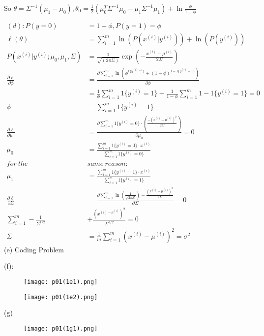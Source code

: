 \documentclass{article}
\begin{document}
So $\theta=\Sigma^{-1}(\mu_1-\mu_0),\theta_0=\frac{1}{2}(\mu_0^T\Sigma^{-1}\mu_0-\mu_1\Sigma^{-1}\mu_1)+\ln \frac{\phi}{1-\phi}$

\begin{align*}
(d): P(y=0)&=1-\phi,P(y=1)=\phi\\
\ell(\theta)&=\sum_{i=1}^m \ln(P(x^{(i)}|y^{(i)}))+\ln(P(y^{(i)}))
\\
P(x^{(i)}|y^{(i)};\mu_0,\mu_1,\Sigma)&=\frac{1}{\sqrt{(2\pi\Sigma)}}\exp(-\frac{x^{(i)}-\mu^{(i)}}{2\Sigma})
\\
\frac{\partial\ell}{\partial\phi}&=\frac{\partial \sum_{i=1}^m \ln(\phi^{1\{y^{(i)=1}\}}+(1-\phi)^{1-1\{y^{(i)}=1\}
})}{\partial \phi}\\&=\frac{1}{\phi}\sum_{i=1}^m 1\{y^{(i)}=1\}-\frac{1}{1-\phi}\sum_{i=1}^m1-1\{y^{(i)}=1\}=0\\
\phi &=\sum_{i=1}^m 1\{y^{(i)}=1\}\\
\frac{\partial\ell}{\partial\mu_0}&=\frac{\partial\sum_{i=1}^m1\{y^{(i)}=0\}\cdot (\frac{-(x^{(i)}-\mu^{(i)})^2}{2\Sigma})}{\partial \mu_0}=0\\
\mu_0&=\frac{\sum_{i=1}^m 1\{y^{(i)}=0\}\cdot x^{(i)}}{\sum_{i=1}^m 1\{y^{(i)}=0\}}\\
for\ the\  &same\  reason: \\
\mu_1&=\frac{\sum_{i=1}^m 1\{y^{(i)}=1\}\cdot x^{(i)}}{\sum_{i=1}^m 1\{y^{(i)}=1\}}\\
\frac{\partial\ell}{\partial\Sigma}&=\frac{\partial\sum_{i=1}^m \ln(\frac{1}{\sqrt{2\pi\Sigma}})-\frac{(x^{(i)}-\mu^{(i)})^2}{2\Sigma}}{\partial \Sigma}=0\\
\sum_{i=1}^m -\frac{1}{\Sigma^{1/2}}&+\frac{(x^{(i)-\mu^{(i)}})^2}{\Sigma^{3/2}}=0 \\
\Sigma&=\frac{1}{m}\sum_{i=1}^m (x^{(i)}-\mu^{(i)})^2=\sigma^2
\end{align*}
(e) Coding Problem

(f):
\begin{figure}[H]
    \centering
    \texttt{[image: p01(1e1).png]}
\end{figure}

\begin{figure}[H]
    \centering
    \texttt{[image: p01(1e2).png]}
\end{figure}

(g)

\begin{figure}[H]
    \centering
    \texttt{[image: p01(1g1).png]}
\end{figure}
\end{document}
